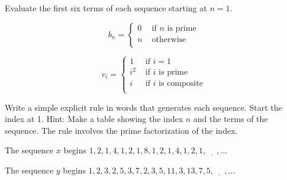 \begin{exer}[\exerU] %
\label{exer_eval_seq_piecewise_prime}
    Evaluate the first six terms of each sequence starting at $n=1$.
        \begin{exerpart}     
            \item $$b_n= \left\{ \begin{array} {ll}
            0 & \text{ if } n \text{ is prime} \\  
            n & \text{ otherwise}  \\ 
            \end{array} \right.$$ 
            
            \item $$v_i= \left\{ \begin{array} {ll}
            1 & \text{ if } i=1 \\ 
            i^2 & \text{ if } i \text{ is prime} \\  
            i & \text{ if } i \text{ is composite} \\ 
            \end{array} \right.$$        
        \end{exerpart} 
\end{exer}

\begin{exer}[\exerU] %
\label{exer_NTE_prime_fact}  
    Write a simple explicit rule in words that generates each sequence. Start the index at 1. Hint: Make a table showing the index $n$ and the terms of the sequence. The rule involves the prime factorization of the index.
        \begin{exerpart}
            \item The sequence $x$ begins $1, 2, 1, 4, 1, 2, 1, 8, 1, 2, 1, 4, 1, 2, 1, \underline{\quad~},\ldots$ %
            \item The sequence $y$ begins $1, 2, 3, 2, 5, 3, 7, 2, 3, 5, 11, 3, 13, 7, 5,  \underline{\quad~},\ldots$ %
        \end{exerpart}
\end{exer}

